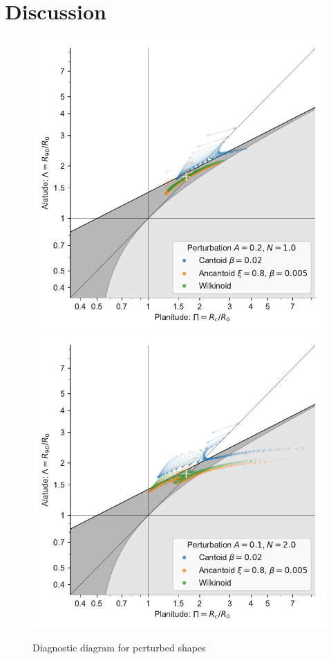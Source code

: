 
\section{Discussion}
\label{sec:discussion}




\begin{figure}
  \centering
  \includegraphics[width=\linewidth]
  {figs/wave-R90-vs-Rc-A020-N10}
  \includegraphics[width=\linewidth]
  {figs/wave-R90-vs-Rc-A010-N20}
  \caption{Diagnostic diagram for perturbed shapes}
  \label{fig:perturb-Rc-R90}
\end{figure}



